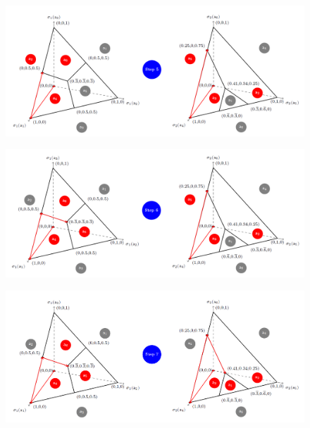 \begin{figure}[H]
\centering
\includegraphics[width=\textwidth]{images/img_2_13_08.png}
\end{figure}
\begin{figure}[H]
\centering
\includegraphics[width=\textwidth]{images/img_2_13_09.png}
\end{figure}
\begin{figure}[H]
\centering
\includegraphics[width=\textwidth]{images/img_2_13_10.png}
\end{figure}